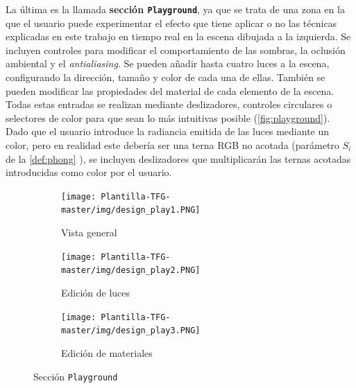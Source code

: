 La última es la llamada \textbf{sección \texttt{Playground}}, ya que se trata de una zona en la que el usuario puede experimentar el efecto que tiene aplicar o no las técnicas explicadas en este trabajo en tiempo real en la escena dibujada a la izquierda. Se incluyen controles para modificar el comportamiento de las sombras, la oclusión ambiental y el \textit{antialiasing}. Se pueden añadir hasta cuatro luces a la escena, configurando la dirección, tamaño y color de cada una de ellas. También se pueden modificar las propiedades del material de cada elemento de la escena. Todas estas entradas se realizan mediante deslizadores, controles circulares o selectores de color para que sean lo más intuitivas posible (\autoref{fig:playground}). Dado que el usuario introduce la radiancia emitida de las luces mediante un color, pero en realidad este debería ser una terna RGB no acotada (parámetro $S_i$ de la \autoref{def:phong} ), se incluyen deslizadores que multiplicarán las ternas acotadas introducidas como color por el usuario.
\begin{figure}[ht!]
    \centering
    \begin{subfigure}[b]{\textwidth}
        \centering
        \texttt{[image: Plantilla-TFG-master/img/design\_play1.PNG]}
        \caption{Vista general}
    \end{subfigure}
    \vspace{20pt}
    \begin{subfigure}[b]{0.45\textwidth}
        \centering
        \texttt{[image: Plantilla-TFG-master/img/design\_play2.PNG]}
        \caption{Edición de luces}
    \end{subfigure}
    \hfill
    \begin{subfigure}[b]{0.45\textwidth}
        \centering
        \texttt{[image: Plantilla-TFG-master/img/design\_play3.PNG]}
        \caption{Edición de materiales}
    \end{subfigure}
    \caption{Sección \texttt{Playground}}
    \label{fig:playground}
\end{figure}



